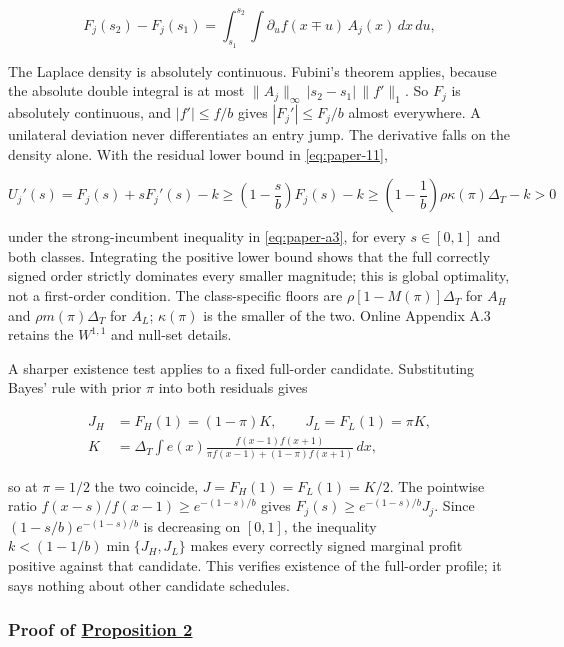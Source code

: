 \[
F_j(s_2)-F_j(s_1)
=\int_{s_1}^{s_2}\int \partial_u f(x\mp u)\,A_j(x)\,dx\,du,
\tag{A.5}\label{eq:paper-a-5}
\]

The Laplace density is absolutely continuous. Fubini's theorem
applies, because the absolute double integral is at most
\(\|A_j\|_\infty\,|s_2-s_1|\,\|f'\|_1\). So \(F_j\) is absolutely
continuous, and \(|f'|\le f/b\) gives \(|F_j'|\le F_j/b\) almost
everywhere. A unilateral deviation never differentiates an entry jump.
The derivative falls on the density alone. With the residual lower
bound in \eqref{eq:paper-11},

\[
U_j'(s)=F_j(s)+sF_j'(s)-k
\ge\left(1-\frac sb\right)F_j(s)-k
\ge\left(1-\frac1b\right)\rho\kappa(\pi)\Delta_T-k>0
\tag{A.6}\label{eq:paper-a-6}
\]

under the strong-incumbent inequality in \eqref{eq:paper-a3}, for every
\(s\in[0,1]\) and both classes. Integrating the positive lower bound
shows that the full correctly signed order strictly dominates every
smaller magnitude; this is global optimality, not a first-order
condition. The class-specific floors are \(\rho[1-M(\pi)]\Delta_T\) for
\(A_H\) and \(\rho m(\pi)\Delta_T\) for \(A_L\); \(\kappa(\pi)\) is the
smaller of the two. Online Appendix A.3 retains the \(W^{1,1}\) and
null-set details.

A sharper existence test applies to a fixed full-order candidate.
Substituting Bayes' rule with prior \(\pi\) into both residuals gives

\[
\begin{aligned}
J_H&=F_H(1)=(1-\pi)K,\qquad J_L=F_L(1)=\pi K,\\
K&=\Delta_T\int e(x)\frac{f(x-1)f(x+1)}{\pi f(x-1)+(1-\pi)f(x+1)}\,dx,
\end{aligned}
\tag{A.7}\label{eq:paper-a-7}
\]

so at \(\pi=1/2\) the two coincide, \(J=F_H(1)=F_L(1)=K/2\). The
pointwise ratio \(f(x-s)/f(x-1)\ge e^{-(1-s)/b}\) gives
\(F_j(s)\ge e^{-(1-s)/b}J_j\). Since \((1-s/b)e^{-(1-s)/b}\) is
decreasing on \([0,1]\), the inequality \(k<(1-1/b)\min\{J_H,J_L\}\)
makes every correctly signed marginal profit positive against that
candidate. This verifies existence of the full-order profile; it says
nothing about other candidate schedules.

\subsubsection{\texorpdfstring{Proof of
\hyperref[result-proposition-2]{Proposition
2}}{Proof of Proposition 2}}\label{proof-of-proposition-2}

